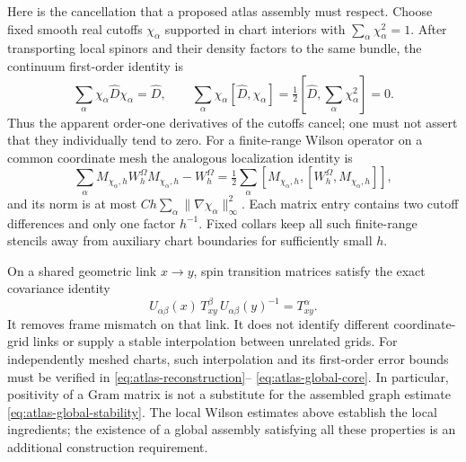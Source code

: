 \documentclass[11pt]{article}
\theoremstyle{definition}
\theoremstyle{remark}
\theoremstyle{definition}
\theoremstyle{remark}
\begin{document}
Here is the cancellation that a proposed atlas assembly must respect.  Choose
fixed smooth real cutoffs $\chi_\alpha$ supported in chart interiors with
$\sum_\alpha\chi_\alpha^2=1$.  After transporting local spinors and their
density factors to the same bundle, the continuum first-order identity is
\begin{equation}
 \sum_\alpha\chi_\alpha\widehat D\chi_\alpha=\widehat D,
 \qquad
 \sum_\alpha\chi_\alpha[\widehat D,\chi_\alpha]
       =\tfrac12[\widehat D,\sum_\alpha\chi_\alpha^2]=0.
 \label{eq:atlas-cutoff-cancellation}
\end{equation}
Thus the apparent order-one derivatives of the cutoffs cancel; one must not
assert that they individually tend to zero.  For a finite-range Wilson
operator on a common coordinate mesh the analogous localization identity is
\begin{equation}
 \sum_\alpha M_{\chi_\alpha,h}W_h^\Omega M_{\chi_\alpha,h}-W_h^\Omega
 =\tfrac12\sum_\alpha
 [M_{\chi_\alpha,h},[W_h^\Omega,M_{\chi_\alpha,h}]],
 \label{eq:Wilson-double-commutator}
\end{equation}
and its norm is at most $Ch\sum_\alpha\|\nabla\chi_\alpha\|_\infty^2$.
Each matrix entry contains two cutoff differences and only one factor $h^{-1}$.
Fixed collars keep all such finite-range stencils away from auxiliary chart
boundaries for sufficiently small $h$.

On a shared geometric link $x\to y$, spin transition matrices satisfy the
exact covariance identity
\[
 U_{\alpha\beta}(x)\,T^\beta_{xy}\,U_{\alpha\beta}(y)^{-1}
       =T^\alpha_{xy}.
\]
It removes frame mismatch on that link.  It does not identify different
coordinate-grid links or supply a stable interpolation between unrelated grids.
For independently meshed charts, such interpolation and its first-order error
bounds must be verified in \eqref{eq:atlas-reconstruction}--
\eqref{eq:atlas-global-core}.  In particular, positivity of a Gram matrix is
not a substitute for the assembled graph estimate
\eqref{eq:atlas-global-stability}.  The local Wilson estimates above establish
the local ingredients; the existence of a global assembly satisfying all these
properties is an additional construction requirement.
\end{document}
